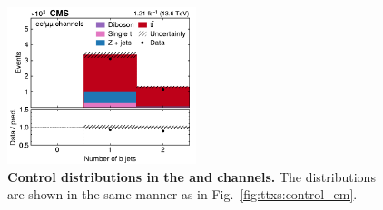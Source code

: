 \begin{figure}[!p]
\hfill
\includegraphics[width=0.49\textwidth]{figures/ttxs/nbtag_eemm.pdf}
\caption{
    \textbf{Control distributions in the \ee and \mumu channels.} The distributions are shown in the same manner as in Fig.~\ref{fig:ttxs:control_em}.
}
\label{fig:ttxs:control_eemm}
\end{figure}

